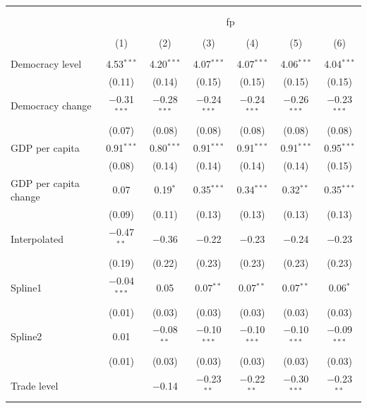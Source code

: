 \documentclass[a4paper]{article}\usepackage[]{graphicx}\usepackage[]{color}
\begin{document}
\begin{table}[!htbp] \centering 
  \caption{} 
  \label{} 
\small 
\begin{tabular}{@{\extracolsep{5pt}}lcccccc} 
\\[-1.8ex]\hline \\[-1.8ex] 
\\[-1.8ex] & \multicolumn{6}{c}{fp} \\ 
\\[-1.8ex] & (1) & (2) & (3) & (4) & (5) & (6)\\ 
\hline \\[-1.8ex] 
 Democracy level & 4.53$^{***}$ & 4.20$^{***}$ & 4.07$^{***}$ & 4.07$^{***}$ & 4.06$^{***}$ & 4.04$^{***}$ \\ 
  & (0.11) & (0.14) & (0.15) & (0.15) & (0.15) & (0.15) \\ 
  Democracy change & $-$0.31$^{***}$ & $-$0.28$^{***}$ & $-$0.24$^{***}$ & $-$0.24$^{***}$ & $-$0.26$^{***}$ & $-$0.23$^{***}$ \\ 
  & (0.07) & (0.08) & (0.08) & (0.08) & (0.08) & (0.08) \\ 
  GDP per capita & 0.91$^{***}$ & 0.80$^{***}$ & 0.91$^{***}$ & 0.91$^{***}$ & 0.91$^{***}$ & 0.95$^{***}$ \\ 
  & (0.08) & (0.14) & (0.14) & (0.14) & (0.14) & (0.15) \\ 
  GDP per capita change & 0.07 & 0.19$^{*}$ & 0.35$^{***}$ & 0.34$^{***}$ & 0.32$^{**}$ & 0.35$^{***}$ \\ 
  & (0.09) & (0.11) & (0.13) & (0.13) & (0.13) & (0.13) \\ 
  Interpolated & $-$0.47$^{**}$ & $-$0.36 & $-$0.22 & $-$0.23 & $-$0.24 & $-$0.23 \\ 
  & (0.19) & (0.22) & (0.23) & (0.23) & (0.23) & (0.23) \\ 
  Spline1 & $-$0.04$^{***}$ & 0.05 & 0.07$^{**}$ & 0.07$^{**}$ & 0.07$^{**}$ & 0.06$^{*}$ \\ 
  & (0.01) & (0.03) & (0.03) & (0.03) & (0.03) & (0.03) \\ 
  Spline2 & 0.01 & $-$0.08$^{**}$ & $-$0.10$^{***}$ & $-$0.10$^{***}$ & $-$0.10$^{***}$ & $-$0.09$^{***}$ \\ 
  & (0.01) & (0.03) & (0.03) & (0.03) & (0.03) & (0.03) \\ 
  Trade level &  & $-$0.14 & $-$0.23$^{**}$ & $-$0.22$^{**}$ & $-$0.30$^{***}$ & $-$0.23$^{**}$ \\ 

\end{tabular}
\end{table}
\end{document}
